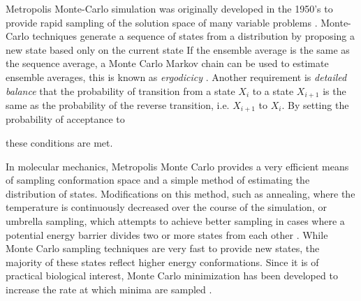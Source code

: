 Metropolis Monte-Carlo simulation was originally developed in the 1950's to provide rapid sampling of the solution space of many variable problems \cite{metropolis1953equation,hastings1970monte}.
Monte-Carlo techniques generate a sequence of states from a distribution by proposing a new state based only on the current state 
If the ensemble average is the same as the sequence average, a Monte Carlo Markov chain can be used to estimate ensemble averages, this is known as {\it ergodicicy} \cite{schlick2010molecular}.
Another requirement is {\it detailed balance} that the probability of transition from a state $X_{i}$ to a state $X_{i+1}$ is the same as the probability of the reverse transition, i.e. $X_{i+1}$ to $X_{i}$.
By setting the probability of acceptance to

these conditions are met.

In molecular mechanics, Metropolis Monte Carlo provides a very efficient means of sampling conformation space and a simple method of estimating the distribution of states.
Modifications on this method, such as annealing, where the temperature is continuously decreased over the course of the simulation, or umbrella sampling, which attempts to achieve better sampling in cases where a potential energy barrier divides two or more states from each other \cite{torrie1977nonphysical}.
While Monte Carlo sampling techniques are very fast to provide new states, the majority of these states reflect higher energy conformations.
Since it is of practical biological interest, Monte Carlo minimization has been developed to increase the rate at which minima are sampled \cite{li1987monte}.

